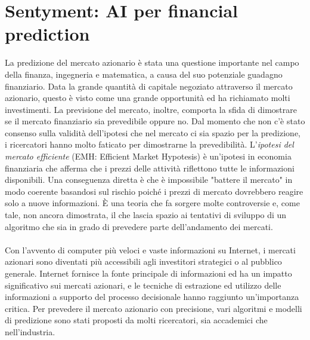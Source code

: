 \documentclass[a4paper,12pt]{report}
\begin{document}
\chapter{Sentyment: AI per financial prediction}
\label{cap2}
La predizione del mercato azionario è stata una questione importante nel campo della finanza, ingegneria e matematica, a causa del suo potenziale guadagno finanziario. Data la grande quantità di capitale negoziato attraverso il mercato azionario, questo è visto come una grande opportunità ed ha richiamato molti investimenti. La previsione del mercato, inoltre, comporta la sfida di dimostrare se il mercato finanziario sia prevedibile oppure no. Dal momento che non c'è stato consenso sulla validità dell'ipotesi che nel mercato ci sia spazio per la predizione, i ricercatori hanno molto faticato per dimostrarne la prevedibilità\cite{nn1}. L'\textit{ipotesi del mercato efficiente} (EMH: Efficient Market Hypotesis) è un'ipotesi in economia finanziaria che afferma che i prezzi delle attività riflettono tutte le informazioni disponibili. Una conseguenza diretta è che è impossibile "battere il mercato" in modo coerente basandosi sul rischio poiché i prezzi di mercato dovrebbero reagire solo a nuove informazioni. È una teoria che fa sorgere molte controversie e, come tale, non ancora dimostrata, il che lascia spazio ai tentativi di sviluppo di un algoritmo che sia in grado di prevedere parte dell'andamento dei mercati.\\~\\
Con l'avvento di computer più veloci e vaste informazioni su Internet, i mercati azionari sono diventati più accessibili agli investitori strategici o al pubblico generale. Internet fornisce la fonte principale di informazioni ed ha un impatto significativo sui mercati azionari, e le tecniche di estrazione ed utilizzo delle informazioni a supporto del processo decisionale hanno raggiunto un'importanza critica. Per prevedere il mercato azionario con precisione, vari algoritmi e modelli di predizione sono stati proposti da molti ricercatori, sia accademici che nell'industria.\\~\\
\end{document}
